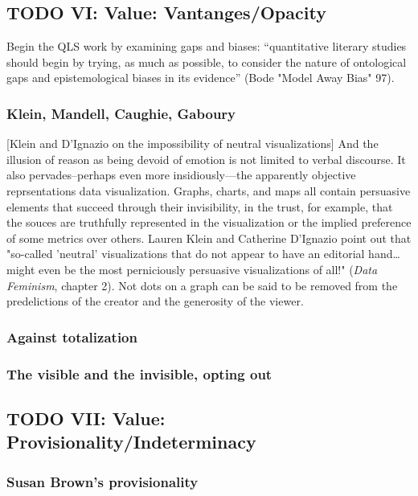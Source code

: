 \documentclass[11pt]{article}
\begin{document}
\subsection{{\bfseries\sffamily TODO} VI: Value: Vantanges/Opacity}
\label{sec:org618e0a0}

Begin the QLS work by examining gaps and biases: “quantitative
literary studies should begin by trying, as much as possible, to
consider the nature of ontological gaps and epistemological biases in
its evidence” (Bode "Model Away Bias" 97).

\subsubsection{Klein, Mandell, Caughie, Gaboury}
\label{sec:org069d24a}
[Klein and D'Ignazio on the impossibility of neutral visualizations]
And the illusion of reason as being devoid of emotion is not limited
to verbal discourse. It also pervades--perhaps even more
insidiously---the apparently objective reprsentations data
visualization. Graphs, charts, and maps all contain persuasive
elements that succeed through their invisibility, in the trust, for
example, that the souces are truthfully represented in the
visualization or the implied preference of some metrics over
others. Lauren Klein and Catherine D'Ignazio point out that "so-called
'neutral' visualizations that do not appear to have an editorial
hand\ldots{} might even be the most perniciously persuasive visualizations
of all!" (\emph{Data Feminism}, chapter 2). Not dots on a graph can be said
to be removed from the predelictions of the creator and the generosity
of the viewer.

\subsubsection{Against totalization}
\label{sec:orgff48ef8}
\subsubsection{The visible and the invisible, opting out}
\label{sec:org275816e}




\subsection{{\bfseries\sffamily TODO} VII: Value: Provisionality/Indeterminacy}
\label{sec:orgac38f98}

\subsubsection{Susan Brown's provisionality}
\label{sec:orgf4fad6b}
\end{document}
